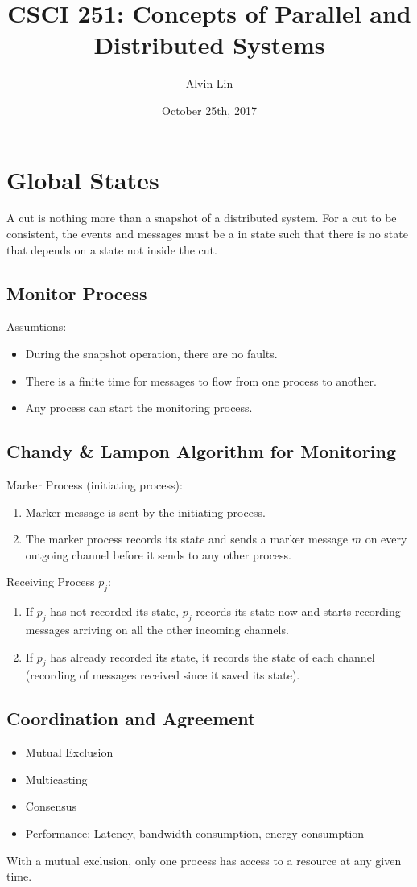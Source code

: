 \documentclass{math}
\title{CSCI 251: Concepts of Parallel and Distributed Systems}
\author{Alvin Lin}
\date{October 25th, 2017}
\begin{document}
\maketitle

\section*{Global States}
A cut is nothing more than a snapshot of a distributed system. For a cut to be
consistent, the events and messages must be a in state such that there is no
state that depends on a state not inside the cut.

\subsection*{Monitor Process}
Assumtions:
\begin{itemize}
  \item During the snapshot operation, there are no faults.
  \item There is a finite time for messages to flow from one process to another.
  \item Any process can start the monitoring process.
\end{itemize}

\subsection*{Chandy \& Lampon Algorithm for Monitoring}
Marker Process (initiating process):
\begin{enumerate}
  \item Marker message is sent by the initiating process.
  \item The marker process records its state and sends a marker message
  \( m \) on every outgoing channel before it sends to any other process.
\end{enumerate}
Receiving Process \( p_j \):
\begin{enumerate}
  \item If \( p_j \) has not recorded its state, \( p_j \) records its state
  now and starts recording messages arriving on all the other incoming
  channels.
  \item If \( p_j \) has already recorded its state, it records the state of
  each channel (recording of messages received since it saved its state).
\end{enumerate}

\subsection*{Coordination and Agreement}
\begin{itemize}
  \item Mutual Exclusion
  \item Multicasting
  \item Consensus
  \item Performance: Latency, bandwidth consumption, energy consumption
\end{itemize}
With a mutual exclusion, only one process has access to a resource at any given
time.
\end{document}
